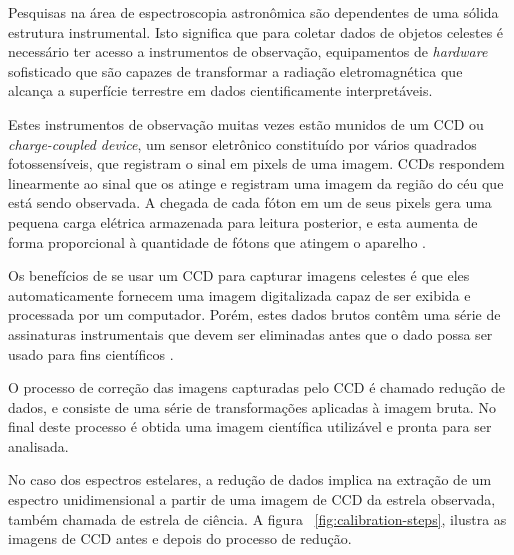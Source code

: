 Pesquisas na área de espectroscopia astronômica são dependentes de uma sólida estrutura instrumental. Isto significa que para coletar dados de objetos celestes é necessário ter acesso a instrumentos de observação, equipamentos de \textit{hardware} sofisticado que são capazes de transformar a radiação eletromagnética que alcança a superfície terrestre em dados cientificamente interpretáveis.

Estes instrumentos de observação muitas vezes estão munidos de um CCD ou \textit{charge-coupled device}, um sensor eletrônico constituído por vários quadrados fotossensíveis, que registram o sinal em pixels de uma imagem. CCDs respondem linearmente ao sinal que os atinge e registram uma imagem da região do céu que está sendo observada. A chegada de cada fóton em um de seus pixels gera uma pequena carga elétrica armazenada para leitura posterior, e esta aumenta de forma proporcional à quantidade de fótons que atingem o aparelho \citep{davenhall20012}.

Os benefícios de se usar um CCD para capturar imagens celestes é que eles automaticamente fornecem uma imagem digitalizada capaz de ser exibida e processada por um computador. Porém, estes dados brutos contêm uma série de assinaturas instrumentais que devem ser eliminadas antes que o dado possa ser usado para fins científicos \citep{davenhall20012}.  

O processo de correção das imagens capturadas pelo CCD é chamado redução de dados, e consiste de uma série de transformações aplicadas à imagem bruta. No final deste processo é obtida uma imagem científica utilizável e pronta para ser analisada.

No caso dos espectros estelares, a redução de dados implica na extração de um espectro unidimensional a partir de uma imagem de CCD da estrela observada, também chamada de estrela de ciência. A figura ~\ref{fig:calibration-steps}, ilustra as imagens de CCD antes e depois do processo de redução.


